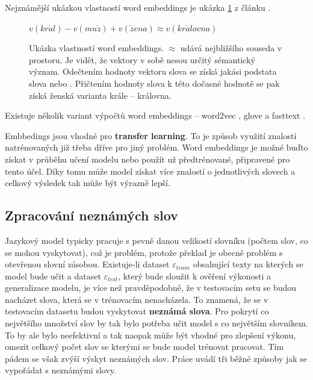 Nejznámější ukázkou vlastností word embeddings je ukázka \ref{figure:kingQueen} z článku \cite{kingQueen}.


\begin{figure}[H]
    \begin{center}
        $
          v(kr\acute{a}l) - v(mu\check{z}) + v(\check{z}ena) \approx v(kr\acute{a}lovna)
        $
    \end{center}
	\caption{Ukázka vlastností word embeddings. $\approx$ udává nejbližšího souseda v prostoru. Je vidět, že vektory v sobě nesou určitý sémantický význam. Odečtením hodnoty vektoru slova  se získá jakási podstata slova  nebo . Přičtením hodnoty slova  k této dočasné hodnotě se pak získá ženská varianta krále -- královna.}
	\label{figure:kingQueen}
\end{figure}


Existuje několik variant výpočtů word embeddings -- word2vec \cite{word2vec}, glove \cite{glove} a fasttext \cite{fasttext}.


Embbedings jsou vhodné pro \textbf{transfer learning}. To je způsob využití znalostí natrénovaných již třeba dříve pro jiný problém. Word embeddings je možné buďto získat v průběhu učení modelu nebo použít už předtrénované, připravené pro tento účel. Díky tomu může model získat více znalostí o jednotlivých slovech a celkový výsledek tak může být výrazně lepší.

\subsection{Zpracování neznámých slov} \label{subsection:oov}
Jazykový model typicky pracuje s pevně danou velikostí slovníku (počtem slov, co se mohou vyskytovat), což je problém, protože překlad je obecně problém s otevřenou slovní zásobou. Existuje-li dataset $\varepsilon_{train}$ obsahující texty na kterých se model bude učit a dataset $\varepsilon_{test}$, který bude sloužit k ověření výkonosti a generalizace modelu, je více než pravděpodobně, že v testovacím setu se budou nacházet slova, která se v trénovacím nenacházela. To znamená, že se v testovacím datasetu budou vyskytovat \textbf{neznámá slova}. Pro pokrytí co největšího množství slov by tak bylo potřeba učit model s co největším slovníkem. To by ale bylo neefektivní a tak naopak může být vhodné pro zlepšení výkonu, omezit celkový počet slov se kterými se bude model trénovat pracovat. Tím pádem se však zvýší výskyt neznámých slov. Práce \cite{nmtTutorial} uvádí tři běžné způsoby jak se vypořádat s neznámými slovy.

